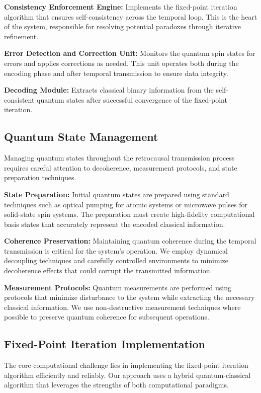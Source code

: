 \documentclass[12pt,a4paper]{article}
\begin{document}
\textbf{Consistency Enforcement Engine:} Implements the fixed-point iteration algorithm that ensures self-consistency across the temporal loop. This is the heart of the system, responsible for resolving potential paradoxes through iterative refinement.

\textbf{Error Detection and Correction Unit:} Monitors the quantum spin states for errors and applies corrections as needed. This unit operates both during the encoding phase and after temporal transmission to ensure data integrity.

\textbf{Decoding Module:} Extracts classical binary information from the self-consistent quantum states after successful convergence of the fixed-point iteration.

\subsection{Quantum State Management}

Managing quantum states throughout the retrocausal transmission process requires careful attention to decoherence, measurement protocols, and state preparation techniques.

\textbf{State Preparation:} Initial quantum states are prepared using standard techniques such as optical pumping for atomic systems or microwave pulses for solid-state spin systems. The preparation must create high-fidelity computational basis states that accurately represent the encoded classical information.

\textbf{Coherence Preservation:} Maintaining quantum coherence during the temporal transmission is critical for the system's operation. We employ dynamical decoupling techniques and carefully controlled environments to minimize decoherence effects that could corrupt the transmitted information.

\textbf{Measurement Protocols:} Quantum measurements are performed using protocols that minimize disturbance to the system while extracting the necessary classical information. We use non-destructive measurement techniques where possible to preserve quantum coherence for subsequent operations.

\subsection{Fixed-Point Iteration Implementation}

The core computational challenge lies in implementing the fixed-point iteration algorithm efficiently and reliably. Our approach uses a hybrid quantum-classical algorithm that leverages the strengths of both computational paradigms.
\end{document}
